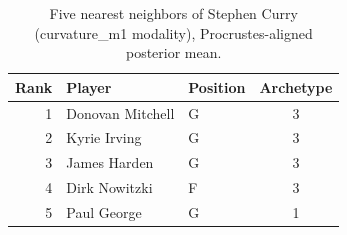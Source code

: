 \begin{table}[htbp]
  \centering\small
  \begin{tabular}{rllc}
    \toprule
    Rank & Player & Position & Archetype \\
    \midrule
    1 & Donovan Mitchell & G & 3 \\
    2 & Kyrie Irving & G & 3 \\
    3 & James Harden & G & 3 \\
    4 & Dirk Nowitzki & F & 3 \\
    5 & Paul George & G & 1 \\
    \bottomrule
  \end{tabular}
  \caption{Five nearest neighbors of Stephen Curry (curvature_m1 modality), Procrustes-aligned posterior mean.}
  \label{tab:Stephen_Curry_neighbors_curvature_m1}
\end{table}


